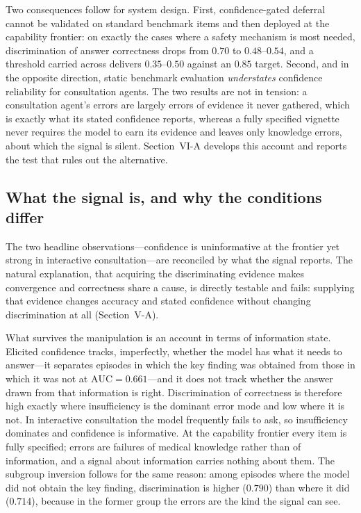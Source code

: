 \documentclass[journal,twoside]{IEEEtran}
\begin{document}
Two consequences follow for system design. First, confidence-gated deferral cannot be validated on
standard benchmark items and then deployed at the capability frontier: on exactly the cases where a
safety mechanism is most needed, discrimination of answer correctness drops from $0.70$ to
$0.48$--$0.54$, and a threshold carried across delivers $0.35$--$0.50$ against an $0.85$ target. Second, and in the opposite direction, static benchmark evaluation \emph{understates}
confidence reliability for consultation agents. The two results are not in tension: a consultation
agent's errors are largely errors of evidence it never gathered, which is exactly what its stated
confidence reports, whereas a fully specified vignette never requires the model to earn its evidence
and leaves only knowledge errors, about which the signal is silent. Section~VI-A develops this
account and reports the test that rules out the alternative.

\subsection{What the signal is, and why the conditions differ}
The two headline observations---confidence is uninformative at the frontier yet strong in
interactive consultation---are reconciled by what the signal reports. The
natural explanation, that acquiring the discriminating evidence makes convergence and correctness
share a cause, is directly testable and fails: supplying that evidence changes accuracy and stated
confidence without changing discrimination at all (Section~V-A).

What survives the manipulation is an account in terms of information state. Elicited confidence
tracks, imperfectly, whether the model has what it needs to answer---it separates episodes in which
the key finding was obtained from those in which it was not at $\mathrm{AUC}=0.661$---and it does not
track whether the answer drawn from that information is right. Discrimination of correctness is
therefore high exactly where insufficiency is the dominant error mode and low where it is not. In
interactive consultation the model frequently fails to ask, so insufficiency dominates and confidence
is informative. At the capability frontier every item is fully specified; errors are failures of
medical knowledge rather than of information, and a signal about information carries nothing about
them. The subgroup inversion follows for the same reason: among episodes where the model did not
obtain the key finding, discrimination is higher ($0.790$) than where it did ($0.714$), because in
the former group the errors are the kind the signal can see.
\end{document}
